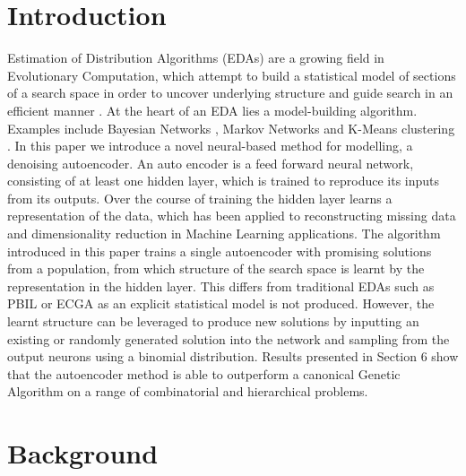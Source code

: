 \documentclass[runningheads,a4paper]{llncs}
\begin{document}
\section{Introduction}

Estimation of Distribution Algorithms (EDAs) are a growing field in Evolutionary Computation, which attempt to build a statistical model of sections of a search space in order to uncover underlying structure and guide search in an efficient manner \cite{pelikan2006scalable}. At the heart of an EDA lies a model-building algorithm. Examples include Bayesian Networks \cite{hboa}, Markov Networks \cite{ref} and K-Means clustering \cite{ref}. In this paper we introduce a novel neural-based method for modelling, a denoising autoencoder. An auto encoder is a feed forward neural network, consisting of at least one hidden layer, which is trained to reproduce its inputs from its outputs. Over the course of training the hidden layer learns a representation of the data, which has been applied to reconstructing missing data \cite{ref} and dimensionality reduction \cite{ref} in Machine Learning applications. The algorithm introduced in this paper trains a single autoencoder with promising solutions from a population, from which structure of the search space is learnt by the representation in the hidden layer. This differs from traditional EDAs such as PBIL \cite{ref } or ECGA \cite{ref} as an explicit statistical model is not produced. However, the learnt structure can be leveraged to produce new solutions by inputting an existing or randomly generated solution into the network and sampling from the output neurons using a binomial distribution. Results presented in Section 6 show that the autoencoder method is able to outperform a canonical Genetic Algorithm on a range of combinatorial and hierarchical problems.

\section{Background}
\end{document}
